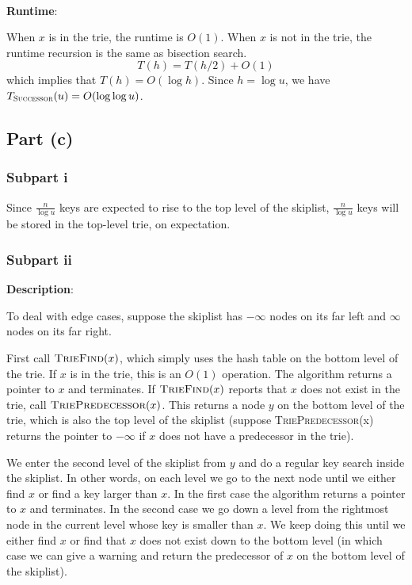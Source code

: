 \documentclass{article}
\begin{document}
~

\noindent\textbf{Runtime}:

When $x$ is in the trie, the runtime is $O(1)$. When $x$ is not in the trie, the runtime recursion is the same as bisection search.
\begin{equation*}
T(h)=T(h/2)+O(1)
\end{equation*}
which implies that $T(h)=O(\log h)$. Since $h=\log u$, we have $T_{\textsc{Successor}}(u)=O(\log\log u)$.

\subsection{Part (c)}
\subsubsection{Subpart i}
Since $\frac{n}{\log u}$ keys are expected to rise to the top level of the skiplist, $\frac{n}{\log u}$ keys will be stored in the top-level trie, on expectation.

\subsubsection{Subpart ii}
\noindent\textbf{Description}:

To deal with edge cases, suppose the skiplist has $-\infty$ nodes on its far left and $\infty$ nodes on its far right.

First call $\textsc{TrieFind}(x)$, which simply uses the hash table on the bottom level of the trie. If $x$ is in the trie, this is an $O(1)$ operation. The algorithm returns a pointer to $x$ and terminates. If $\textsc{TrieFind}(x)$ reports that $x$ does not exist in the trie, call $\textsc{TriePredecessor}(x)$. This returns a node $y$ on the bottom level of the trie, which is also the top level of the skiplist (suppose \textsc{TriePredecessor}(x) returns the pointer to $-\infty$ if $x$ does not have a predecessor in the trie).

We enter the second level of the skiplist from $y$ and do a regular key search inside the skiplist. In other words, on each level we go to the next node until we either find $x$ or find a key larger than $x$. In the first case the algorithm returns a pointer to $x$ and terminates. In the second case we go down a level from the rightmost node in the current level whose key is smaller than $x$. We keep doing this until we either find $x$ or find that $x$ does not exist down to the bottom level (in which case we can give a warning and return the predecessor of $x$ on the bottom level of the skiplist).
\end{document}
